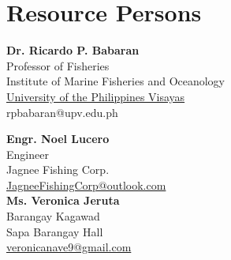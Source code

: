 %
%
%                 

\chapter{Resource Persons}
\label{sec:appendixb}
%
%
%
%

%
%
\newcommand{\resperson}[4]{\textbf{#1} \\ #2 \\ #3 \\ \url{#4}\vspace{-0.5\baselineskip}\\}

\resperson{Dr. Ricardo P. Babaran }
{Professor of Fisheries}
{Institute of Marine Fisheries and Oceanology}
{University of the Philippines Visayas}
{rpbabaran@upv.edu.ph}

\resperson{Engr. Noel Lucero }{Engineer}{Jagnee Fishing Corp. }{JagneeFishingCorp@outlook.com}
\resperson{Ms. Veronica Jeruta }{Barangay Kagawad}{Sapa Barangay Hall }{veronicanave9@gmail.com}